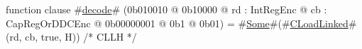 function clause #\hyperref[zdecode]{decode}# (0b010010 @ 0b10000 @ rd : IntRegEnc @ cb : CapRegOrDDCEnc @ 0b00000001 @ 0b1 @ 0b01) = #\hyperref[zSome]{Some}#(#\hyperref[zCLoadLinked]{CLoadLinked}#(rd, cb, true,  H)) /* CLLH  */
